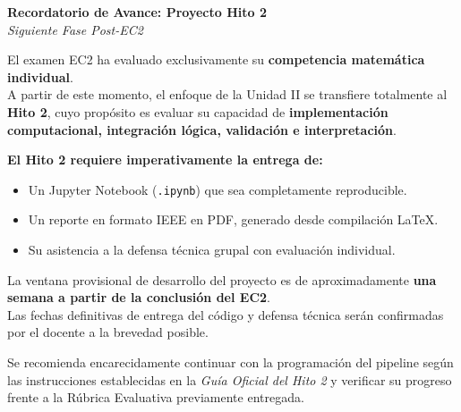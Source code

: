 \documentclass[11pt, a4paper]{article}
\begin{document}
\vspace*{2cm}
\begin{center}
    \Large\textbf{\textcolor{ucbblue}{Recordatorio de Avance: Proyecto Hito 2}}\\[0.4cm]
    \large\textit{Siguiente Fase Post-EC2}
\end{center}

\vspace{1cm}
\begin{tcolorbox}[colback=yellow!10, colframe=black, title=\textbf{Transición de Evaluación}, fonttitle=\bfseries]
    El examen EC2 ha evaluado exclusivamente su \textbf{competencia matemática individual}. \\
    
    A partir de este momento, el enfoque de la Unidad II se transfiere totalmente al \textbf{Hito 2}, cuyo propósito es evaluar su capacidad de \textbf{implementación computacional, integración lógica, validación e interpretación}.
\end{tcolorbox}

\vspace{0.5cm}
\textbf{El Hito 2 requiere imperativamente la entrega de:}
\begin{itemize}
    \item Un Jupyter Notebook (\texttt{.ipynb}) que sea completamente reproducible.
    \item Un reporte en formato IEEE en PDF, generado desde compilación LaTeX.
    \item Su asistencia a la defensa técnica grupal con evaluación individual.
\end{itemize}

\vspace{0.5cm}
\begin{tcolorbox}[colback=white, colframe=ucbblue, title=\textbf{Cronograma Provisional}, fonttitle=\bfseries]
    La ventana provisional de desarrollo del proyecto es de aproximadamente \textbf{una semana a partir de la conclusión del EC2}. \\
    
    Las fechas definitivas de entrega del código y defensa técnica serán confirmadas por el docente a la brevedad posible.
\end{tcolorbox}

\vspace{0.5cm}
Se recomienda encarecidamente continuar con la programación del pipeline según las instrucciones establecidas en la \textit{Guía Oficial del Hito 2} y verificar su progreso frente a la Rúbrica Evaluativa previamente entregada.
\end{document}

